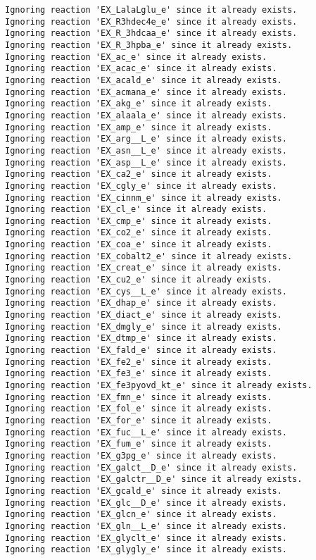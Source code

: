 \documentclass[
  letterpaper,
  DIV=11,
  numbers=noendperiod]{scrartcl}
\begin{document}
\begin{verbatim}
Ignoring reaction 'EX_LalaLglu_e' since it already exists.
Ignoring reaction 'EX_R3hdec4e_e' since it already exists.
Ignoring reaction 'EX_R_3hdcaa_e' since it already exists.
Ignoring reaction 'EX_R_3hpba_e' since it already exists.
Ignoring reaction 'EX_ac_e' since it already exists.
Ignoring reaction 'EX_acac_e' since it already exists.
Ignoring reaction 'EX_acald_e' since it already exists.
Ignoring reaction 'EX_acmana_e' since it already exists.
Ignoring reaction 'EX_akg_e' since it already exists.
Ignoring reaction 'EX_alaala_e' since it already exists.
Ignoring reaction 'EX_amp_e' since it already exists.
Ignoring reaction 'EX_arg__L_e' since it already exists.
Ignoring reaction 'EX_asn__L_e' since it already exists.
Ignoring reaction 'EX_asp__L_e' since it already exists.
Ignoring reaction 'EX_ca2_e' since it already exists.
Ignoring reaction 'EX_cgly_e' since it already exists.
Ignoring reaction 'EX_cinnm_e' since it already exists.
Ignoring reaction 'EX_cl_e' since it already exists.
Ignoring reaction 'EX_cmp_e' since it already exists.
Ignoring reaction 'EX_co2_e' since it already exists.
Ignoring reaction 'EX_coa_e' since it already exists.
Ignoring reaction 'EX_cobalt2_e' since it already exists.
Ignoring reaction 'EX_creat_e' since it already exists.
Ignoring reaction 'EX_cu2_e' since it already exists.
Ignoring reaction 'EX_cys__L_e' since it already exists.
Ignoring reaction 'EX_dhap_e' since it already exists.
Ignoring reaction 'EX_diact_e' since it already exists.
Ignoring reaction 'EX_dmgly_e' since it already exists.
Ignoring reaction 'EX_dtmp_e' since it already exists.
Ignoring reaction 'EX_fald_e' since it already exists.
Ignoring reaction 'EX_fe2_e' since it already exists.
Ignoring reaction 'EX_fe3_e' since it already exists.
Ignoring reaction 'EX_fe3pyovd_kt_e' since it already exists.
Ignoring reaction 'EX_fmn_e' since it already exists.
Ignoring reaction 'EX_fol_e' since it already exists.
Ignoring reaction 'EX_for_e' since it already exists.
Ignoring reaction 'EX_fuc__L_e' since it already exists.
Ignoring reaction 'EX_fum_e' since it already exists.
Ignoring reaction 'EX_g3pg_e' since it already exists.
Ignoring reaction 'EX_galct__D_e' since it already exists.
Ignoring reaction 'EX_galctr__D_e' since it already exists.
Ignoring reaction 'EX_gcald_e' since it already exists.
Ignoring reaction 'EX_glc__D_e' since it already exists.
Ignoring reaction 'EX_glcn_e' since it already exists.
Ignoring reaction 'EX_gln__L_e' since it already exists.
Ignoring reaction 'EX_glyclt_e' since it already exists.
Ignoring reaction 'EX_glygly_e' since it already exists.

\end{verbatim}
\end{document}
